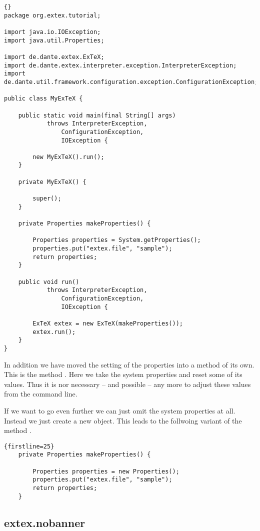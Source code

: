 \begin{lstlisting}{}
package org.extex.tutorial;

import java.io.IOException;
import java.util.Properties;

import de.dante.extex.ExTeX;
import de.dante.extex.interpreter.exception.InterpreterException;
import de.dante.util.framework.configuration.exception.ConfigurationException;

public class MyExTeX {

    public static void main(final String[] args)
            throws InterpreterException,
                ConfigurationException,
                IOException {

        new MyExTeX().run();
    }

    private MyExTeX() {

        super();
    }

    private Properties makeProperties() {

        Properties properties = System.getProperties();
        properties.put("extex.file", "sample");
        return properties;
    }

    public void run()
            throws InterpreterException,
                ConfigurationException,
                IOException {

        ExTeX extex = new ExTeX(makeProperties());
        extex.run();
    }
}
\end{lstlisting}

In addition we have moved the setting of the properties into a method
of its own. This is the method . Here we take
the system properties and reset some of its values. Thus it is nor
necessary -- and possible -- any more to adjust these values from the
command line.

If we want to go even further we can just omit the system properties
at all. Instead we just create a new  object. This
leads to the follwoing variant of the method .

\begin{lstlisting}{firstline=25}
    private Properties makeProperties() {

        Properties properties = new Properties();
        properties.put("extex.file", "sample");
        return properties;
    }
\end{lstlisting}

\subsection{extex.nobanner}

